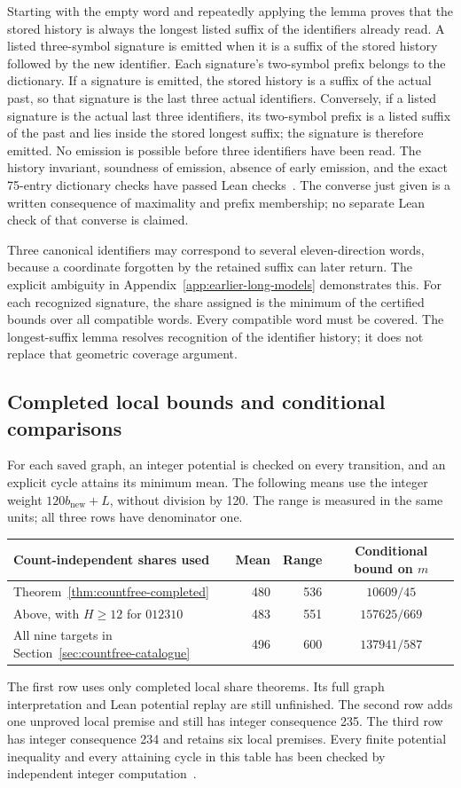 Starting with the empty word and repeatedly applying the lemma proves that the stored history is always the longest listed suffix of the identifiers already read. A listed three-symbol signature is emitted when it is a suffix of the stored history followed by the new identifier. Each signature's two-symbol prefix belongs to the dictionary. If a signature is emitted, the stored history is a suffix of the actual past, so that signature is the last three actual identifiers. Conversely, if a listed signature is the actual last three identifiers, its two-symbol prefix is a listed suffix of the past and lies inside the stored longest suffix; the signature is therefore emitted. No emission is possible before three identifiers have been read. The history invariant, soundness of emission, absence of early emission, and the exact 75-entry dictionary checks have passed Lean checks~\cite{historyarchive}. The converse just given is a written consequence of maximality and prefix membership; no separate Lean check of that converse is claimed.

Three canonical identifiers may correspond to several eleven-direction words, because a coordinate forgotten by the retained suffix can later return. The explicit ambiguity in Appendix~\ref{app:earlier-long-models} demonstrates this. For each recognized signature, the share assigned is the minimum of the certified bounds over all compatible words. Every compatible word must be covered. The longest-suffix lemma resolves recognition of the identifier history; it does not replace that geometric coverage argument.

\subsection{Completed local bounds and conditional comparisons}
For each saved graph, an integer potential is checked on every transition, and an explicit cycle attains its minimum mean. The following means use the integer weight $120b_{\mathrm{new}}+L$, without division by 120. The range is measured in the same units; all three rows have denominator one.
\begin{center}\small
\begin{tabular}{p{}r r c}
\toprule
Count-independent shares used & Mean & Range & Conditional bound on $m$\\\midrule
Theorem~\ref{thm:countfree-completed} & 480 & 536 & $10609/45$\\
Above, with $H\ge12$ for $012310$ & 483 & 551 & $157625/669$\\
All nine targets in Section~\ref{sec:countfree-catalogue} & 496 & 600 & $137941/587$\\
\bottomrule
\end{tabular}
\end{center}
The first row uses only completed local share theorems. Its full graph interpretation and Lean potential replay are still unfinished. The second row adds one unproved local premise and still has integer consequence 235. The third row has integer consequence 234 and retains six local premises. Every finite potential inequality and every attaining cycle in this table has been checked by independent integer computation~\cite{countfreearchive}.

